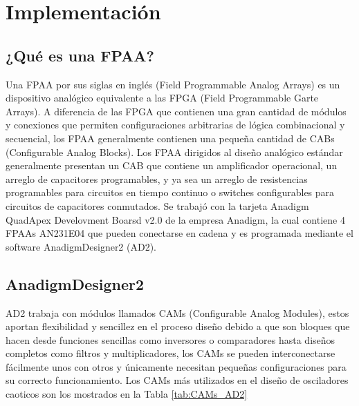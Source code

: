 \chapter{Implementación}

	\section{¿Qué es una FPAA?}
	Una FPAA  por sus siglas en inglés (Field Programmable Analog Arrays) es un dispositivo analógico equivalente a las FPGA (Field Programmable Garte Arrays). A diferencia de las FPGA que contienen una gran cantidad de módulos y conexiones que permiten configuraciones arbitrarias de lógica combinacional y secuencial, los FPAA generalmente contienen una pequeña cantidad de CABs (Configurable Analog Blocks). Los FPAA dirigidos al diseño analógico estándar generalmente presentan un CAB que contiene un amplificador operacional, un arreglo de capacitores programables, y ya sea un arreglo de resistencias programables para circuitos en tiempo continuo o switches configurables para circuitos de capacitores conmutados.
	Se trabajó con la tarjeta Anadigm QuadApex Develovment Boarsd v2.0 de la empresa Anadigm, la cual contiene 4 FPAAs AN231E04 que pueden conectarse en cadena y es programada mediante el software AnadigmDesigner2 (AD2). 
	
	\section{AnadigmDesigner2}
	
	AD2 trabaja con módulos llamados CAMs (Configurable Analog Modules), estos aportan flexibilidad y sencillez en el proceso diseño debido a que son bloques que hacen desde funciones sencillas como inversores o comparadores hasta diseños completos como filtros y multiplicadores, los CAMs se pueden interconectarse fácilmente unos con otros y únicamente necesitan pequeñas configuraciones para su correcto funcionamiento. Los CAMs más utilizados en el diseño de osciladores caoticos son los mostrados en la Tabla \ref{tab:CAMs_AD2}
	

